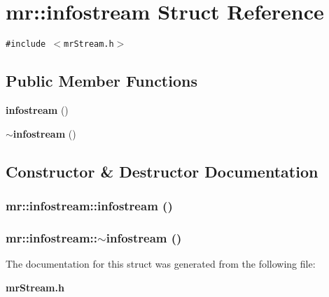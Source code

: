 \section{mr::infostream Struct Reference}
\label{structmr_1_1infostream}
{\tt \#include $<$mr\-Stream.h$>$}

\subsection*{Public Member Functions}
\begin{CompactItemize}
\item 
{\bf infostream} ()
\item 
{\bf $\sim$infostream} ()
\end{CompactItemize}


\subsection{Constructor \& Destructor Documentation}
\subsubsection{\setlength{\rightskip}{0pt plus 5cm}mr::infostream::infostream ()\hspace{0.3cm}{\tt  [inline]}}\label{structmr_1_1infostream_a0}


\subsubsection{\setlength{\rightskip}{0pt plus 5cm}mr::infostream::$\sim${\bf infostream} ()\hspace{0.3cm}{\tt  [inline]}}\label{structmr_1_1infostream_a1}




The documentation for this struct was generated from the following file:\begin{CompactItemize}
\item 
{\bf mr\-Stream.h}\end{CompactItemize}
